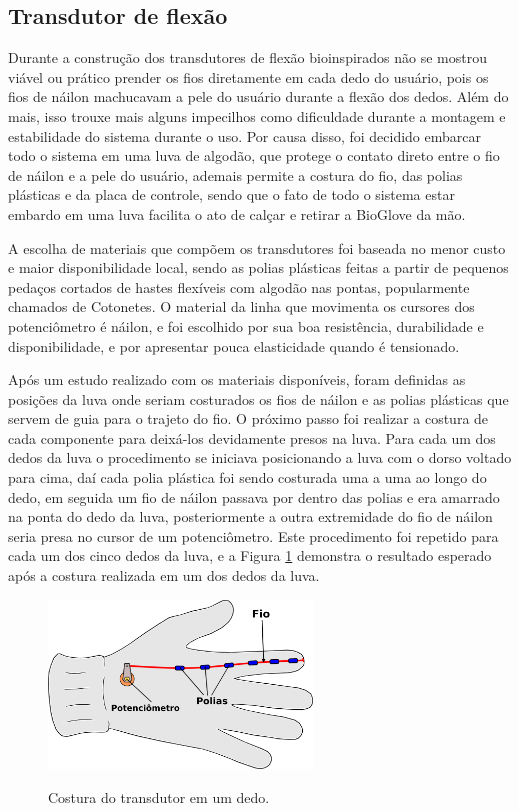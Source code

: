 \documentclass[
	12pt,				%
	openright,			%
	oneside,			%
	a4paper,			%
	english,			%
	brazil				%
	]{abntex2}
\begin{document}
		\subsection{Transdutor de flexão}

		Durante a construção dos transdutores de flexão bioinspirados não se mostrou viável ou prático prender os fios diretamente em cada dedo do usuário, pois os fios de náilon machucavam a pele do usuário durante a flexão dos dedos. Além do mais, isso trouxe mais alguns impecilhos como dificuldade durante a montagem e estabilidade do sistema durante o uso. Por causa disso, foi decidido embarcar todo o sistema em uma luva de algodão, que protege o contato direto entre o fio de náilon e a pele do usuário, ademais permite a costura do fio, das polias plásticas e da placa de controle, sendo que o fato de todo o sistema estar embardo em uma luva facilita o ato de calçar e retirar a BioGlove da mão.
		
		A escolha de materiais que compõem os transdutores foi baseada no menor custo e maior disponibilidade local, sendo as polias plásticas feitas a partir de pequenos pedaços cortados de hastes flexíveis com algodão nas pontas, popularmente chamados de Cotonetes. O material da linha que movimenta os cursores dos potenciômetro é náilon, e foi escolhido por sua boa resistência, durabilidade e disponibilidade, e por apresentar pouca elasticidade quando é tensionado.


		Após um estudo realizado com os materiais disponíveis, foram definidas as posições da luva onde seriam costurados os fios de náilon e as polias plásticas que servem de guia para o trajeto do fio. O próximo passo foi realizar a costura de cada componente para deixá-los devidamente presos na luva. Para cada um dos dedos da luva o procedimento se iniciava posicionando a luva com o dorso voltado para cima, daí cada polia plástica foi sendo costurada uma a uma ao longo do dedo, em seguida um fio de náilon passava por dentro das polias e era amarrado na ponta do dedo da luva, posteriormente a outra extremidade do fio de náilon seria presa no cursor de um potenciômetro. Este procedimento foi repetido para cada um dos cinco dedos da luva, e a Figura \ref{Fig:glove-wire-pot1} demonstra o resultado esperado após a costura realizada em um dos dedos da luva.


		\begin{figure}[h!]
			\centering
			\caption{Costura do transdutor em um dedo.}
  		\includegraphics[width=7cm]{./figures/glove-wire-pot1.png}
  		\label{Fig:glove-wire-pot1}
		\end{figure}
\end{document}
